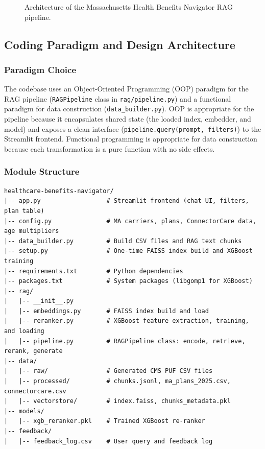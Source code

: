 \documentclass[12pt, letterpaper]{article}
\begin{document}
\begin{figure}[H]
  \centering
  \caption{Architecture of the Massachusetts Health Benefits Navigator RAG pipeline.}
  \label{fig:arch}
\end{figure}

\subsection{Coding Paradigm and Design Architecture}

\subsubsection{Paradigm Choice}

The codebase uses an Object-Oriented Programming (OOP) paradigm for the RAG pipeline (\texttt{RAGPipeline} class in \texttt{rag/pipeline.py}) and a functional paradigm for data construction (\texttt{data\_builder.py}). OOP is appropriate for the pipeline because it encapsulates shared state (the loaded index, embedder, and model) and exposes a clean interface (\texttt{pipeline.query(prompt, filters)}) to the Streamlit frontend. Functional programming is appropriate for data construction because each transformation is a pure function with no side effects.

\subsubsection{Module Structure}

\begin{lstlisting}[caption={Repository directory structure}, label=lst:structure]
healthcare-benefits-navigator/
|-- app.py                  # Streamlit frontend (chat UI, filters, plan table)
|-- config.py               # MA carriers, plans, ConnectorCare data, age multipliers
|-- data_builder.py         # Build CSV files and RAG text chunks
|-- setup.py                # One-time FAISS index build and XGBoost training
|-- requirements.txt        # Python dependencies
|-- packages.txt            # System packages (libgomp1 for XGBoost)
|-- rag/
|   |-- __init__.py
|   |-- embeddings.py       # FAISS index build and load
|   |-- reranker.py         # XGBoost feature extraction, training, and loading
|   |-- pipeline.py         # RAGPipeline class: encode, retrieve, rerank, generate
|-- data/
|   |-- raw/                # Generated CMS PUF CSV files
|   |-- processed/          # chunks.jsonl, ma_plans_2025.csv, connectorcare.csv
|   |-- vectorstore/        # index.faiss, chunks_metadata.pkl
|-- models/
|   |-- xgb_reranker.pkl    # Trained XGBoost re-ranker
|-- feedback/
|   |-- feedback_log.csv    # User query and feedback log
\end{lstlisting}
\end{document}
